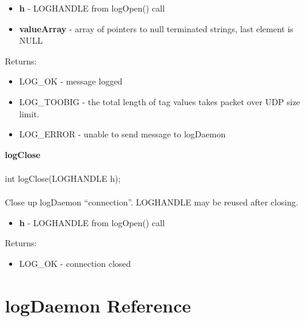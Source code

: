 \documentclass[11pt]{article}
\begin{document}
\begin{itemize}
\item {\bf h} - LOGHANDLE from logOpen() call
\item {\bf valueArray} - array of pointers to null terminated strings, last element is NULL
\end{itemize}
Returns:

\begin{itemize}
\item LOG\_OK - message logged
\item LOG\_TOOBIG - the total length of tag values takes packet over UDP size limit.
\item LOG\_ERROR - unable to send message to logDaemon
\end{itemize}
{\bf logClose}\\
\\
int logClose(LOGHANDLE h);\\
\\
Close up logDaemon ``connection''. LOGHANDLE may be reused after closing.

\begin{itemize}
\item {\bf h} - LOGHANDLE from logOpen() call
\end{itemize}
Returns:

\begin{itemize}
\item LOG\_OK - connection closed
\end{itemize}
\section{logDaemon Reference}
\end{document}
